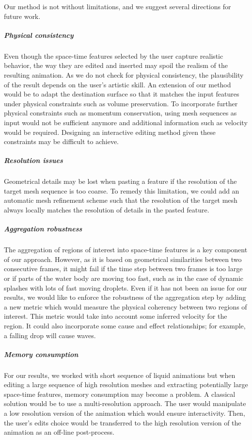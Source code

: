 Our method is not without limitations, and we suggest several directions for future work.

\subparagraph{Physical consistency} 
Even though the space-time features selected by the user capture realistic behavior, the way they are edited and inserted may spoil the realism of the resulting animation. 
As we do not check for physical consistency, the plausibility of the result depends on the user's artistic skill. 
An extension of our method would be to adapt the destination surface so that it matches the input features under physical constraints such as volume preservation. 
To incorporate further physical constraints such as momentum conservation, using mesh sequences as input would not be sufficient anymore and additional information such as velocity would be required. 
Designing an interactive editing method given these constraints may be difficult to achieve.

\subparagraph{Resolution issues} 
Geometrical details may be lost when pasting a feature if the resolution of the target mesh sequence is too coarse. 
To remedy this limitation, we could add an automatic mesh refinement scheme such that the resolution of the target mesh always locally matches the resolution of details in the pasted feature.

\subparagraph{Aggregation robustness} 
The aggregation of regions of interest into space-time features is a key component of our approach. 
However, as it is based on geometrical similarities between two consecutive frames, it might fail if the time step between two frames is too large or if parts of the water body are moving too fast, such as in the case of dynamic splashes with lots of fast moving droplets. 
Even if it has not been an issue for our results, we would like to enforce the robustness of the aggregation step by adding a new metric which would measure the physical coherency between two regions of interest. 
This metric would take into account some inferred velocity for the region. It could also incorporate some cause and effect relationships; for example, a falling drop will cause waves. 

\subparagraph{Memory consumption} 
For our results, we worked with short sequence of liquid animations but when editing a large sequence of high resolution meshes and extracting potentially large space-time features, memory consumption may become a problem. 
A classical solution would be to use a multi-resolution approach.
The user would manipulate a low resolution version of the animation which would ensure interactivity. 
Then, the user's edits choice would be transferred to the high resolution version of the animation as an off-line post-process.

